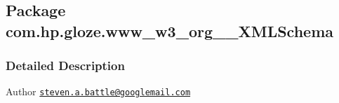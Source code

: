 \hypertarget{namespacecom_1_1hp_1_1gloze_1_1www__w3__org__2001___x_m_l_schema}{
\subsection{Package com.hp.gloze.www\_\-w3\_\-org\_\_\-XMLSchema}
\label{namespacecom_1_1hp_1_1gloze_1_1www__w3__org__2001___x_m_l_schema}
}


\subsubsection{Detailed Description}
\begin{DoxyAuthor}{Author}
\href{mailto:steven.a.battle@googlemail.com}{\tt steven.a.battle@googlemail.com} 
\end{DoxyAuthor}
